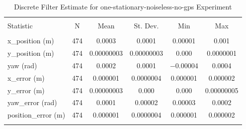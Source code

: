 
\begin{table}[htbp] \centering 
  \caption{Discrete Filter Estimate for one-stationary-noiseless-no-gps Experiment} 
  \label{tab:one_stationary_noiseless_no_gps_discrete_summary} 
\begin{tabular}{@{\extracolsep{5pt}}lccccc} 
\\[-1.8ex]\hline 
\hline \\[-1.8ex] 
Statistic & \multicolumn{1}{c}{N} & \multicolumn{1}{c}{Mean} & \multicolumn{1}{c}{St. Dev.} & \multicolumn{1}{c}{Min} & \multicolumn{1}{c}{Max} \\ 
\hline \\[-1.8ex] 
x\_position (m) & 474 & \num{0.0003} & \num{0.0001} & \num{0.00001} & \num{0.001} \\ 
y\_position (m) & 474 & \num{0.00000003} & \num{0.00000003} & \num{0.000} & \num{0.0000001} \\ 
yaw (rad) & 474 & \num{0.0002} & \num{0.0001} & \num{-0.00004} & \num{0.0004} \\ 
x\_error (m) & 474 & \num{0.000001} & \num{0.0000004} & \num{0.000001} & \num{0.000002} \\ 
y\_error (m) & 474 & \num{0.00000003} & \num{0.000} & \num{0.000} & \num{0.00000005} \\ 
yaw\_error (rad) & 474 & \num{0.0001} & \num{0.00002} & \num{0.00003} & \num{0.0002} \\ 
position\_error (m) & 474 & \num{0.000001} & \num{0.0000004} & \num{0.000001} & \num{0.000002} \\ 
\hline \\[-1.8ex] 
\end{tabular} 
\end{table} 
